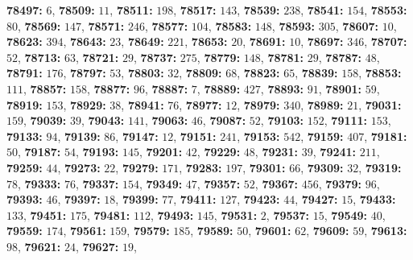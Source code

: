 \textsf{\bfseries 78497:} $6$, \textsf{\bfseries 78509:} $11$, \textsf{\bfseries 78511:} $198$, \textsf{\bfseries 78517:} $143$, \textsf{\bfseries 78539:} $238$, \textsf{\bfseries 78541:} $154$, \textsf{\bfseries 78553:} $80$, \textsf{\bfseries 78569:} $147$, \textsf{\bfseries 78571:} $246$, \textsf{\bfseries 78577:} $104$, \textsf{\bfseries 78583:} $148$, \textsf{\bfseries 78593:} $305$, \textsf{\bfseries 78607:} $10$, \textsf{\bfseries 78623:} $394$, \textsf{\bfseries 78643:} $23$, \textsf{\bfseries 78649:} $221$, \textsf{\bfseries 78653:} $20$, \textsf{\bfseries 78691:} $10$, \textsf{\bfseries 78697:} $346$, \textsf{\bfseries 78707:} $52$, \textsf{\bfseries 78713:} $63$, \textsf{\bfseries 78721:} $29$, \textsf{\bfseries 78737:} $275$, \textsf{\bfseries 78779:} $148$, \textsf{\bfseries 78781:} $29$, \textsf{\bfseries 78787:} $48$, \textsf{\bfseries 78791:} $176$, \textsf{\bfseries 78797:} $53$, \textsf{\bfseries 78803:} $32$, \textsf{\bfseries 78809:} $68$, \textsf{\bfseries 78823:} $65$, \textsf{\bfseries 78839:} $158$, \textsf{\bfseries 78853:} $111$, \textsf{\bfseries 78857:} $158$, \textsf{\bfseries 78877:} $96$, \textsf{\bfseries 78887:} $7$, \textsf{\bfseries 78889:} $427$, \textsf{\bfseries 78893:} $91$, \textsf{\bfseries 78901:} $59$, \textsf{\bfseries 78919:} $153$, \textsf{\bfseries 78929:} $38$, \textsf{\bfseries 78941:} $76$, \textsf{\bfseries 78977:} $12$, \textsf{\bfseries 78979:} $340$, \textsf{\bfseries 78989:} $21$, \textsf{\bfseries 79031:} $159$, \textsf{\bfseries 79039:} $39$, \textsf{\bfseries 79043:} $141$, \textsf{\bfseries 79063:} $46$, \textsf{\bfseries 79087:} $52$, \textsf{\bfseries 79103:} $152$, \textsf{\bfseries 79111:} $153$, \textsf{\bfseries 79133:} $94$, \textsf{\bfseries 79139:} $86$, \textsf{\bfseries 79147:} $12$, \textsf{\bfseries 79151:} $241$, \textsf{\bfseries 79153:} $542$, \textsf{\bfseries 79159:} $407$, \textsf{\bfseries 79181:} $50$, \textsf{\bfseries 79187:} $54$, \textsf{\bfseries 79193:} $145$, \textsf{\bfseries 79201:} $42$, \textsf{\bfseries 79229:} $48$, \textsf{\bfseries 79231:} $39$, \textsf{\bfseries 79241:} $211$, \textsf{\bfseries 79259:} $44$, \textsf{\bfseries 79273:} $22$, \textsf{\bfseries 79279:} $171$, \textsf{\bfseries 79283:} $197$, \textsf{\bfseries 79301:} $66$, \textsf{\bfseries 79309:} $32$, \textsf{\bfseries 79319:} $78$, \textsf{\bfseries 79333:} $76$, \textsf{\bfseries 79337:} $154$, \textsf{\bfseries 79349:} $47$, \textsf{\bfseries 79357:} $52$, \textsf{\bfseries 79367:} $456$, \textsf{\bfseries 79379:} $96$, \textsf{\bfseries 79393:} $46$, \textsf{\bfseries 79397:} $18$, \textsf{\bfseries 79399:} $77$, \textsf{\bfseries 79411:} $127$, \textsf{\bfseries 79423:} $44$, \textsf{\bfseries 79427:} $15$, \textsf{\bfseries 79433:} $133$, \textsf{\bfseries 79451:} $175$, \textsf{\bfseries 79481:} $112$, \textsf{\bfseries 79493:} $145$, \textsf{\bfseries 79531:} $2$, \textsf{\bfseries 79537:} $15$, \textsf{\bfseries 79549:} $40$, \textsf{\bfseries 79559:} $174$, \textsf{\bfseries 79561:} $159$, \textsf{\bfseries 79579:} $185$, \textsf{\bfseries 79589:} $50$, \textsf{\bfseries 79601:} $62$, \textsf{\bfseries 79609:} $59$, \textsf{\bfseries 79613:} $98$, \textsf{\bfseries 79621:} $24$, \textsf{\bfseries 79627:} $19$, 
